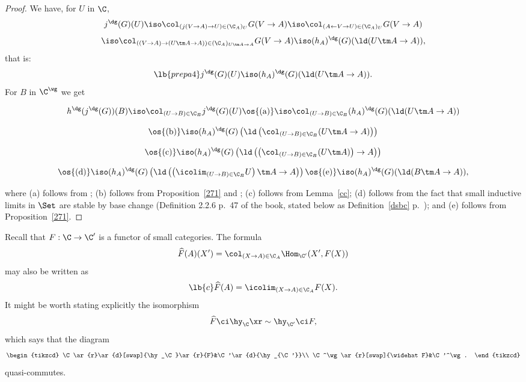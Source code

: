 \documentclass[12pt]{article}
\theoremstyle{remark}
\theoremstyle{definition}
\begin{document}
\begin{proof}
We have, for $U$ in $\C$, 
$$
j^\dg(G)(U)\iso\col_{(j(V\to A)\to U)\in(\C_A)_U}G(V\to A)\iso\col_{(A\leftarrow V\to U)\in(\C_A)_U}G(V\to A)
$$
$$
\iso\col_{((V\to A)\to(U\tm A\to A))\in(\C_A)_{U\tm A\to A}}G(V\to A)\iso(h_A)^\dg(G)(\ld(U\tm A\to A)),
$$
that is: 
%
\begin{equation}\lb{prepa4}
j^\dg(G)(U)\iso(h_A)^\dg(G)(\ld(U\tm A\to A)).
\end{equation} 
%
For $B$ in $\C^\wg$ we get 

$$h^\dg(j^\dg(G))(B)\iso\col_{(U\to B)\in\C_B}j^\dg(G)(U)\os{(\text a)}\iso\col_{(U\to B)\in\C_B}(h_A)^\dg(G)(\ld(U\tm A\to A))$$

$$\os{(\text b)}\iso(h_A)^\dg(G)\left(\ld\left(\col_{(U\to B)\in\C_B}(U\tm A\to A)\right)\right)$$

$$\os{(\text c)}\iso(h_A)^\dg(G)\left(\ld\left(\left(\col_{(U\to B)\in\C_B}(U\tm A)\right)\to A\right)\right)$$

$$\os{(\text d)}\iso(h_A)^\dg(G)\left(\ld\left(\left(\icolim_{(U\to B)\in\C_B}U\right)\tm A\to A\right)\right)\os{(\text e)}\iso(h_A)^\dg(G)(\ld(B\tm A\to A)),$$ 

\nn where 
(a) follows from ; 
(b) follows from Proposition~\ref{271} and ;  
(c) follows from Lemma~\ref{cc}; 
(d) follows from the fact that small inductive limits in $\Set$ are stable by base change (Definition 2.2.6 p.~47 of the book, stated below as Definition~\ref{dsbc} p.~); and 
(e) follows from Proposition~\ref{271}.
\end{proof}



Recall that $F:\C\to\C'$ is a functor of small categories. The formula 
$$
\widehat F(A)(X')=\col_{(X\to A)\in\C_A}\Hom_{\C'}(X',F(X))
$$ 
may also be written as 
\begin{equation}\lb{c}
\widehat F(A)=\icolim_{(X\to A)\in\C_A}F(X).
\end{equation}
It might be worth stating explicitly the isomorphism 
$$
\widehat F\ci\hy_\C\xr\sim\hy_{\C'}\ci F, 
$$ 
which says that the diagram 
$$
\begin{tikzcd}
\C\ar{r}\ar{d}[swap]{\hy_\C}\ar{r}{F}&\C'\ar{d}{\hy_{\C'}}\\ 
\C^\wg\ar{r}[swap]{\widehat F}&\C'^\wg.
\end{tikzcd}
$$ 
quasi-commutes. 

\end{document}
